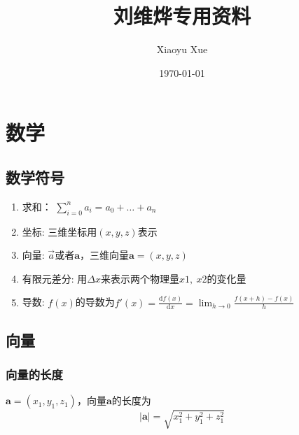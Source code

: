 \documentclass[a4paper,oneside,11pt]{article}
\title{刘维烨专用资料}
\author{Xiaoyu Xue}
\date{\today}
\newcommand{\bol}[1]{\textbf{#1}}
\newcommand{\diff}{\mathrm{d}}
\begin{document}
\maketitle
\section{数学}
\subsection{数学符号}
\begin{enumerate}
	\item 求和： $\displaystyle \sum_{i = 0} ^ n a_i = a_0 + \ldots + a_n$
	\item 坐标: 三维坐标用$(x,y,z)$表示
	\item 向量: $\vec{a}$或者$\bol{a}$，三维向量$\bol{a} = (x,y,z)$
	\item 有限元差分: 用$\Delta x$来表示两个物理量$x1,~x2$的变化量
	\item 导数: $f(x)$的导数为$\displaystyle f'(x) = \displaystyle\frac{\diff f(x)}{\diff x} = \displaystyle\lim_{h \to 0}\frac{f(x + h) - f(x)}{h}$
\end{enumerate}
\subsection{向量}
\subsubsection{向量的长度}
$\bol{a} = (x_1, y_1, z_1)$，向量$\bol{a}$的长度为
\begin{displaymath}
\vert \bol{a} \vert = \sqrt{x_1^2 + y_1^2 + z_1^2}
\end{displaymath}
\end{document}
